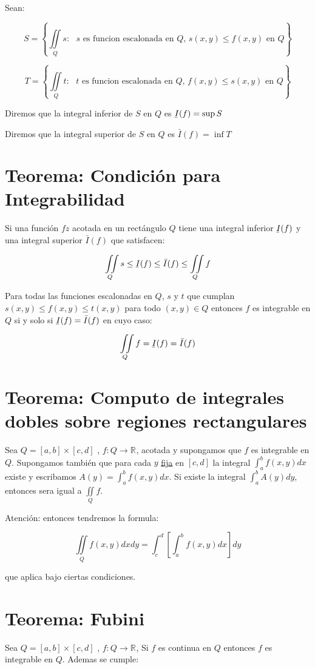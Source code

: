 \documentclass[12pt]{article}
\newcommand{\teorema}[1]{\section{Teorema: #1}}
\newcommand{\R}[1]{\mathbb{R}^{#1}}
\newcommand{\ubar}[1]{\underaccent{\bar}{#1}}
\begin{document}
	Sean:
	
	$$ S = \left\{ \iint\limits_Q s : \text{ $s$ es funcion escalonada en $Q$, } s(x,y) \leq f(x,y) \text{ en $Q$} \right\} $$
	
	$$ T = \left\{ \iint\limits_Q t : \text{ $t$ es funcion escalonada en $Q$, } f(x,y) \leq s(x,y) \text{ en $Q$} \right\} $$
	
	Diremos que la integral inferior de $S$ en $Q$ es $\ubar{I}(f) = \sup S$
	
	Diremos que la integral superior de $S$ en $Q$ es $\bar{I}(f) = \inf T$
	
	\teorema{Condición para Integrabilidad}
	
	Si una función $fz$ acotada en un rectángulo $Q$ tiene una integral inferior $\ubar{I}(f)$ y una integral superior $\bar{I}(f)$ que satisfacen:
	
	\begin{equation}
		\iint\limits_Q s \leq \ubar{I}(f) \leq \bar{I}(f) \leq \iint\limits_Q f
	\end{equation}
	
	Para todas las funciones escalonadas en $Q$, $s$ y $t$ que cumplan $s(x,y) \leq f(x,y) \leq t(x,y)$ para todo $(x,y) \in Q$ entonces $f$ es integrable en $Q$ si y solo si $\ubar{I}(f) = \bar{I}(f)$ en cuyo caso:
	
	\begin{equation}
		\iint\limits_Q f = \ubar{I}(f) = \bar{I}(f)
	\end{equation}
	
	\teorema{Computo de integrales dobles sobre regiones rectangulares}
	
	Sea $Q = [a,b]\times[c,d]$ , $f:Q \rightarrow \R{}$, acotada y supongamos que $f$ es integrable en $Q$. Supongamos también que para cada $y$ \underline{fija} en $[c,d]$ la integral $\int_{a}^{b}f(x,y)dx$ existe y escribamos $A(y) = \int_{a}^{b} f(x,y)dx$.
	Si existe la integral $\int_{a}^{b}A(y)dy$, entonces sera igual a $\iint\limits_Q f$.
	
	\bigskip
	
	Atención: entonces tendremos la formula:
	
	\begin{equation}
		\iint\limits_Q f(x,y)dxdy = \int_{c}^{d} \left[ \int_{a}^{b} f(x,y)dx \right]dy
	\end{equation}
	
	que aplica bajo ciertas condiciones.
	
	\teorema{Fubini}
	
	Sea $Q = [a,b]\times[c,d]$ , $f:Q \rightarrow \R{}$, Si $f$ es continua en $Q$ entonces $f$ es integrable en $Q$. Ademas se cumple:
	
\end{document}

